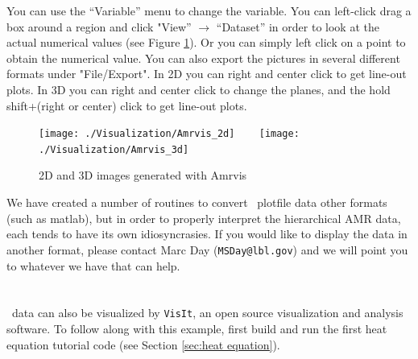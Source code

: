 \begin{enumerate}
  You can use the ``Variable'' menu to change the variable.
  You can left-click drag a box around a region
  and click "View'' $\rightarrow$ ``Dataset''
  in order to look at the actual numerical values
  (see Figure \ref{Fig:Amrvis}).
  Or you can simply left click on a point to obtain the numerical value.
  You can also export the
  pictures in several different formats under "File/Export".
  In 2D you can right and center click to get line-out plots.
  In 3D you can right and center click to change the planes, and the hold
  shift+(right or center) click to get line-out plots.

\begin{figure}[tb]
\centering
\texttt{[image: ./Visualization/Amrvis\_2d]}
~~~
\texttt{[image: ./Visualization/Amrvis\_3d]}
\caption{2D and 3D images generated with Amrvis}
\label{Fig:Amrvis}
\end{figure}

  We have created a number of routines to convert \amrex\ plotfile data
  other formats (such as matlab), but in order to properly interpret 
  the hierarchical AMR data, each tends to have its own idiosyncrasies.
  If you would like to display the data in another format, please contact
  Marc Day ({\tt MSDay@lbl.gov}) and we will point you to whatever we have
  that can help.

\end{enumerate}

\section{\visit}
\label{sec:visit}

\amrex\ data can also be visualized by {\tt VisIt}, an open
source visualization and analysis software.  To follow along with this example,
first build and run the first heat equation tutorial code
(see Section \ref{sec:heat equation}).

